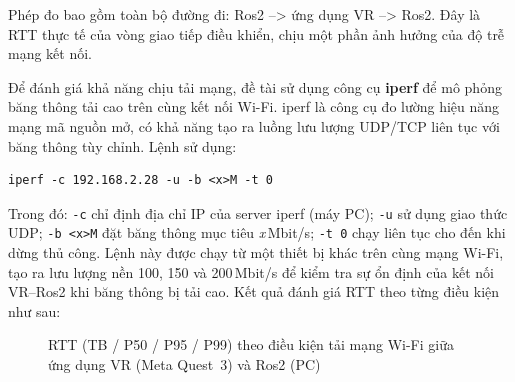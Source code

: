 Phép đo bao gồm toàn bộ đường đi: Ros2 --> ứng dụng VR --> Ros2. Đây là RTT thực tế của vòng giao tiếp điều khiển, chịu một phần ảnh hưởng của độ trễ mạng kết nối.

Để đánh giá khả năng chịu tải mạng, đề tài sử dụng công cụ \textbf{iperf} để mô phỏng băng thông tải cao trên cùng kết nối Wi-Fi. iperf là công cụ đo lường hiệu năng mạng mã nguồn mở, có khả năng tạo ra luồng lưu lượng UDP/TCP liên tục với băng thông tùy chỉnh. Lệnh sử dụng:

\begin{lstlisting}[style=bashstyle]
iperf -c 192.168.2.28 -u -b <x>M -t 0
\end{lstlisting}

Trong đó: \texttt{-c} chỉ định địa chỉ IP của server iperf (máy PC); \texttt{-u} sử dụng giao thức UDP; \texttt{-b <x>M} đặt băng thông mục tiêu \textit{x}\,Mbit/s; \texttt{-t 0} chạy liên tục cho đến khi dừng thủ công. Lệnh này được chạy từ một thiết bị khác trên cùng mạng Wi-Fi, tạo ra lưu lượng nền 100, 150 và 200\,Mbit/s để kiểm tra sự ổn định của kết nối VR--Ros2 khi băng thông bị tải cao. Kết quả đánh giá RTT theo từng điều kiện như sau:

\begin{figure}[H]
\centering
{}
\caption{RTT (TB / P50 / P95 / P99) theo điều kiện tải mạng Wi-Fi giữa ứng dụng VR (Meta Quest~3) và Ros2 (PC)}
\label{fig:rtt-bar-chart}
\end{figure}

